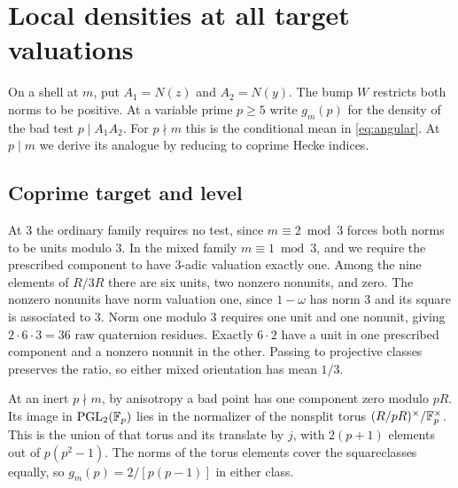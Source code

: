 \section{Local densities at all target valuations}\label{sec:local}
On a shell at \(m\), put \(A_1=N(z)\) and \(A_2=N(y)\).
The bump \(W\) restricts both norms to be positive. At a variable
prime \(p\ge5\) write \(g_m(p)\) for the density of the bad test
\(p\mid A_1A_2\). For \(p\nmid m\) this is the conditional mean in
\eqref{eq:angular}. At \(p\mid m\) we derive its analogue by reducing
to coprime Hecke indices.

\subsection{Coprime target and level}
At \(3\) the ordinary family requires no test, since \(m\equiv2\bmod3\)
forces both norms to be units modulo \(3\). In the mixed family
\(m\equiv1\bmod3\), and we require the prescribed component to have
\(3\)-adic valuation exactly one. Among the nine elements of \(R/3R\)
there are six units, two nonzero nonunits, and zero. The nonzero
nonunits have norm valuation one, since \(1-\omega\) has norm \(3\)
and its square is associated to \(3\). Norm one modulo \(3\)
requires one unit and one nonunit, giving \(2\cdot6\cdot3=36\)
raw quaternion residues. Exactly \(6\cdot2\) have a unit in one
prescribed component and a nonzero nonunit in the other. Passing to projective classes preserves the ratio,
so either mixed orientation has mean \(1/3\).

At an inert \(p\nmid m\), by anisotropy a bad point has one
component zero modulo \(pR\). Its image in
\(\operatorname{PGL}_2(\mathbb F_p)\) lies in the normalizer of the nonsplit torus
\((R/pR)^\times/\mathbb F_p^\times\). This is the union of that torus and
its translate by \(j\), with \(2(p+1)\) elements out of
\(p(p^2-1)\). The norms of the torus elements cover the squareclasses
equally, so \(g_m(p)=2/[p(p-1)]\) in either class.

